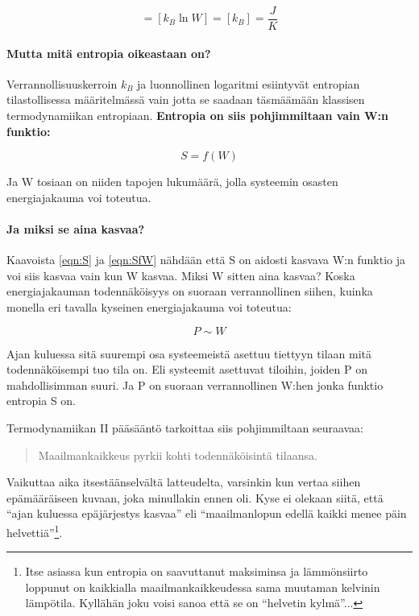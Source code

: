 \documentclass[12pt,a4paper,finnish]{book}
\begin{document}
\begin{equation}
 [S] = [k_B\ln W] = [k_B] = \frac{J}{K} %
\end{equation}

\paragraph{Mutta mitä entropia oikeastaan on?}

Verrannollisuuskerroin $k_B$ ja luonnollinen logaritmi esiintyvät entropian tilastollisessa määritelmässä vain 
jotta se saadaan täsmäämään klassisen termodynamiikan entropiaan. \textbf{Entropia on siis pohjimmiltaan vain 
W:n funktio:}

\begin{equation}
\label{eqn:SfW}
 S = f(W)
\end{equation}

Ja W tosiaan on niiden tapojen lukumäärä, jolla systeemin osasten energiajakauma voi toteutua. 

\paragraph{Ja miksi se aina kasvaa?}

Kaavoista \ref{eqn:S} ja \ref{eqn:SfW} nähdään että S on aidosti kasvava W:n funktio ja voi siis 
kasvaa vain kun W kasvaa. Miksi W sitten aina kasvaa? Koska energiajakauman todennäköisyys 
on suoraan verrannollinen siihen, kuinka monella eri tavalla kyseinen energiajakauma voi toteutua:

\begin{equation}
 P \sim W
\end{equation}

Ajan kuluessa sitä suurempi osa systeemeistä asettuu tiettyyn tilaan mitä todennäköisempi tuo tila on.
Eli systeemit asettuvat tiloihin, joiden P on mahdollisimman suuri. Ja P on suoraan verrannollinen W:hen 
jonka funktio entropia S on.

Termodynamiikan II pääsääntö tarkoittaa siis pohjimmiltaan seuraavaa:

\begin{quote}
 Maailmankaikkeus pyrkii kohti todennäköisintä tilaansa.
\end{quote}

Vaikuttaa aika itsestäänselvältä latteudelta, varsinkin kun vertaa siihen epämääräiseen kuvaan, joka 
minullakin ennen oli. Kyse ei olekaan siitä, että ``ajan kuluessa epäjärjestys kasvaa'' eli 
``maailmanlopun edellä kaikki menee päin helvettiä''\footnote{Itse asiassa kun entropia on saavuttanut 
maksiminsa ja lämmönsiirto loppunut on kaikkialla maailmankaikkeudessa sama muutaman kelvinin lämpötila. 
Kyllähän joku voisi sanoa että se on ``helvetin kylmä''...}.
\end{document}
